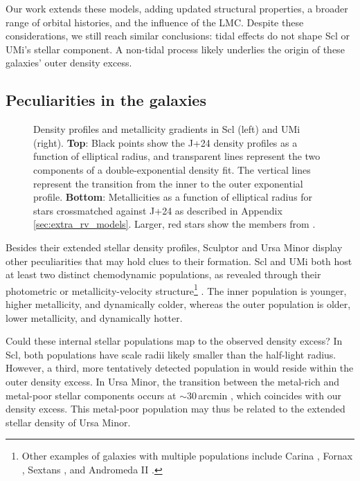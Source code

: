 Our work extends these models, adding updated structural properties, a
broader range of orbital histories, and the influence of the LMC.
Despite these considerations, we still reach similar conclusions: tidal
effects do not shape Scl or UMi's stellar component. A non-tidal process
likely underlies the origin of these galaxies' outer density excess.

\subsection{Peculiarities in the galaxies}\label{sec:peculiarities}

\begin{figure}
\centering
{}
\caption[Metallicity gradients in Sculptor and Ursa Minor]{Density
profiles and metallicity gradients in Scl (left) and UMi (right).
\textbf{Top}: Black points show the J+24 density profiles as a function
of elliptical radius, and transparent lines represent the two components
of a double-exponential density fit. The vertical lines represent the
transition from the inner to the outer exponential profile.
\textbf{Bottom}: Metallicities as a function of elliptical radius for
stars crossmatched against J+24 as described in Appendix
\ref{sec:extra_rv_models}. Larger, red stars show the members from
\citet{sestito+2023a, sestito+2023b}.}\label{fig:metallicity_gradients}
\end{figure}

Besides their extended stellar density profiles, Sculptor and Ursa Minor
display other peculiarities that may hold clues to their formation. Scl
and UMi both host at least two distinct chemodynamic populations, as
revealed through their photometric or metallicity-velocity
structure\footnote{Other examples of galaxies with multiple populations
  include Carina \citep{battaglia+2012, fabrizio+2016, kordopatis+2016},
  Fornax
  \citep{battaglia+2006, amorisco+evans2012, delpino+aparicio+hidalgo2015},
  Sextans
  \citep{battaglia+2011, cicuendez+battaglia2018, roederer+2023}, and
  Andromeda II
  \citep{mcconnachie+arimoto+irwin2007, ho+2012, delpino+2017}.}
\citep{tolstoy+2004, battaglia+2008, pace+2020}. The inner population is
younger, higher metallicity, and dynamically colder, whereas the outer
population is older, lower metallicity, and dynamically hotter.

Could these internal stellar populations map to the observed density
excess? In Scl, both populations have scale radii likely smaller than
the half-light radius. However, a third, more tentatively detected
population in \citet{arroyo-polonio+2024} would reside within the outer
density excess. In Ursa Minor, the transition between the metal-rich and
metal-poor stellar components occurs at \({\sim} 30\,\)arcmin
\citep{pace+2020}, which coincides with our density excess. This
metal-poor population may thus be related to the extended stellar
density of Ursa Minor.

